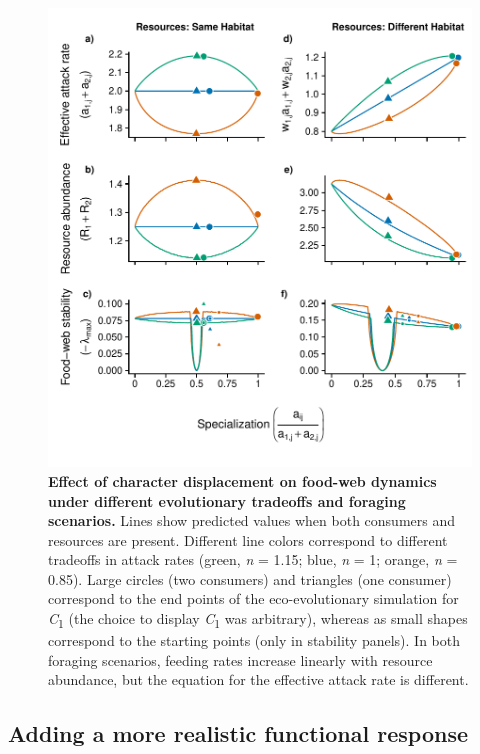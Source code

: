 \documentclass[11pt,]{article}
\begin{document}
\begin{figure}
\centering
\includegraphics{Fig_3_MacArthur_LawlorSmith.pdf}
\caption{\label{fig:plot_fig3}\textbf{Effect of character displacement
on food-web dynamics under different evolutionary tradeoffs and foraging
scenarios.} Lines show predicted values when both consumers and
resources are present. Different line colors correspond to different
tradeoffs in attack rates (green, \emph{n} = 1.15; blue, \emph{n} = 1;
orange, \emph{n} = 0.85). Large circles (two consumers) and triangles
(one consumer) correspond to the end points of the eco-evolutionary
simulation for \emph{C}\textsubscript{1} (the choice to display
\emph{C}\textsubscript{1} was arbitrary), whereas as small shapes
correspond to the starting points (only in stability panels). In both
foraging scenarios, feeding rates increase linearly with resource
abundance, but the equation for the effective attack rate is different.}
\end{figure}

\subsection{Adding a more realistic functional
response}\label{adding-a-more-realistic-functional-response}
\end{document}
